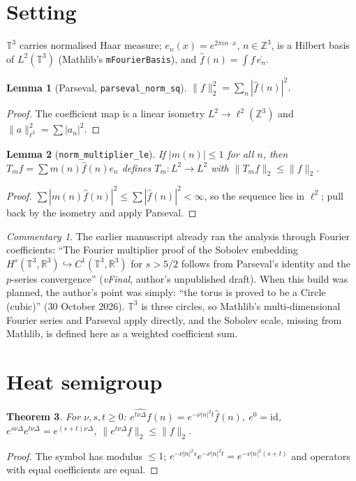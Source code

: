 \documentclass[11pt]{article}
\newtheorem{theorem}{Theorem}\newtheorem{lemma}[theorem]{Lemma}
\theoremstyle{remark}\newtheorem*{commentary}{Commentary}
\begin{document}
\section{Setting}
$\mathbb T^3$ carries normalised Haar measure; $e_n(x)=e^{2\pi i n\cdot x}$, $n\in\mathbb Z^3$, is a
Hilbert basis of $L^2(\mathbb T^3)$ (Mathlib's \texttt{mFourierBasis}), and
$\hat f(n)=\int f\,\overline{e_n}$.
\begin{lemma}[Parseval, \texttt{parseval\_norm\_sq}] $\|f\|_2^2=\sum_n|\hat f(n)|^2$.\end{lemma}
\begin{proof} The coefficient map is a linear isometry $L^2\to\ell^2(\mathbb Z^3)$ and
$\|a\|_{\ell^2}^2=\sum|a_n|^2$.\end{proof}
\begin{lemma}[\texttt{norm\_multiplier\_le}] If $|m(n)|\le1$ for all $n$, then $T_m f=\sum m(n)\hat f(n)e_n$
defines $T_m:L^2\to L^2$ with $\|T_mf\|_2\le\|f\|_2$.\end{lemma}
\begin{proof} $\sum|m(n)\hat f(n)|^2\le\sum|\hat f(n)|^2<\infty$, so the sequence lies in $\ell^2$;
pull back by the isometry and apply Parseval.\end{proof}
\begin{commentary} The earlier manuscript already ran the analysis through Fourier coefficients:
``The Fourier multiplier proof of the Sobolev embedding $H^s(\mathbb T^3,\mathbb R^3)\hookrightarrow
C^1(\mathbb T^3,\mathbb R^3)$ for $s>5/2$ follows from Parseval's identity and the $p$-series
convergence'' (\emph{vFinal}, author's unpublished draft). When this build was planned, the author's point was
simply: ``the torus is proved to be a Circle (cubic)'' (30 October 2026). $\mathbb T^3$ is three
circles, so Mathlib's multi-dimensional Fourier series and Parseval apply directly, and the Sobolev
scale, missing from Mathlib, is defined here as a weighted coefficient sum.\end{commentary}

\section{Heat semigroup}
\begin{theorem} For $\nu,s,t\ge0$: $\widehat{e^{t\nu\Delta}f}(n)=e^{-\nu|n|^2t}\hat f(n)$,
$e^{0}=\mathrm{id}$, $e^{s\nu\Delta}e^{t\nu\Delta}=e^{(s+t)\nu\Delta}$, $\|e^{t\nu\Delta}f\|_2\le\|f\|_2$.\end{theorem}
\begin{proof} The symbol has modulus $\le1$; $e^{-\nu|n|^2s}e^{-\nu|n|^2t}=e^{-\nu|n|^2(s+t)}$ and
operators with equal coefficients are equal.\end{proof}
\end{document}
